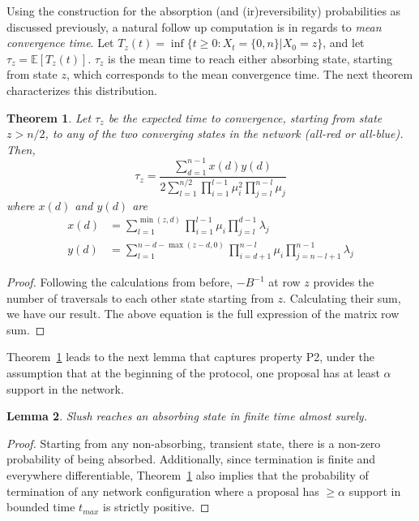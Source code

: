 \documentclass[letterpaper,twocolumn,10pt]{article}
\newcommand\ddfrac[2]{\frac{\displaystyle #1}{\displaystyle #2}}
\newtheorem{theorem}{Theorem}
\newtheorem{lemma}[theorem]{Lemma}
\theoremstyle{definition}
\begin{document}
\begin{appendices}
Using the construction for the absorption (and (ir)reversibility) probabilities as discussed previously, a natural follow up computation is in regards to \emph{mean convergence time}. 
Let $T_{z}(t) = \inf \{t \geq 0 : X_t = \{0, n\} | X_0 = z\}$, and let $\tau_z = \mathbb{E}[T_{z}(t)]$. $\tau_z$ is the mean time to reach either absorbing state, starting from state $z$, which corresponds to the mean convergence time. The next theorem characterizes this distribution.

\begin{theorem}
\label{theorem:mean-convergence-time}
Let $\tau_z$ be the expected time to convergence, starting from state $z > n/2$, to any of the two converging states in the network (all-red or all-blue). Then, 
\begin{equation}
\tau_z = \ddfrac{\sum_{d = 1}^{n-1}x(d)y(d)}{2\sum_{l = 1}^{n/2}\prod_{i=1}^{l-1}\mu_i^2\prod_{j=l}^{n-l}\mu_j}
\end{equation}
where $x(d)$ and $y(d)$ are
\begin{equation}
\begin{split}
x(d) &= \sum_{l = 1}^{\min(z, d)} \prod_{i=1}^{l-1} \mu_i \prod_{j = l}^{d-1} \lambda_j\\
y(d) &= \sum_{l = 1}^{n - d - \max(z-d, 0)} \prod_{i = d+1}^{n-l} \mu_i \prod_{j = n - l + 1}^{n - 1} \lambda_j
\end{split}
\end{equation}
\end{theorem}

\begin{proof}
Following the calculations from before, $-B^{-1}$ at row $z$ provides the number of traversals to each other state starting from $z$. Calculating their sum, we have our result. The above equation is the full expression of the matrix row sum. 
\end{proof}

Theorem~\ref{theorem:mean-convergence-time} leads to the next lemma that captures property P2, under the assumption that at the beginning of the protocol, one proposal has at least $\alpha$ support in the network. 
\begin{lemma}
Slush reaches an absorbing state in finite time almost surely.
\label{lemma:finitetermination}
\end{lemma}

\begin{proof}
Starting from any non-absorbing, transient state, there is a non-zero probability of being absorbed. Additionally, since termination is finite and everywhere differentiable, Theorem~\ref{theorem:mean-convergence-time} also implies that the probability of termination of any network configuration where a proposal has $\geq \alpha$ support in bounded time $t_{max}$ is strictly positive. 
\end{proof}


\end{appendices}
\end{document}
